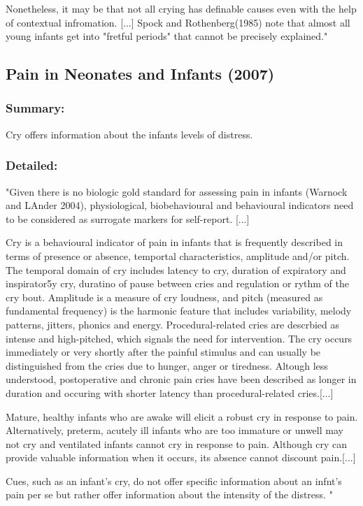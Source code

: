 \documentclass[11pt,twocolumn]{scrartcl}
\begin{document}
Nonetheless, it may be that not all crying has definable causes even with the help of contextual infromation. [...] Spock and Rothenberg(1985) note that almost all young infants get into "fretful periods" that cannot be precisely explained." \cite{Gustafson2000}

\subsection{Pain in Neonates and Infants (2007)}

\subsubsection*{Summary:} 
Cry offers information about the infants levels of distress.

\subsubsection*{Detailed:}

"Given there is no biologic gold standard for assessing pain in infants (Warnock and LAnder 2004), physiological, biobehavioural and behavioural indicators need to be considered as surrogate markers for self-report. [...]

Cry is a behavioural indicator of pain in infants that is frequently described in terms of presence or absence, temportal characteristics, amplitude and/or pitch. The temporal domain of cry includes latency to cry, duration of expiratory and inspirator5y cry, duratino of pause between cries and regulation or rythm of the cry bout. Amplitude is a measure of cry loudness, and pitch (measured as fundamental frequency) is the harmonic feature that includes variability, melody patterns, jitters, phonics and energy. Procedural-related cries are descrbied as intense and high-pitched, which signals the need for intervention. The cry occurs immediately or very shortly after the painful stimulus and can usually be distinguished from the cries due to hunger, anger or tiredness. Altough less understood, postoperative and chronic pain cries have been described as longer in duration and occuring with shorter latency than procedural-related cries.[...] 

Mature, healthy infants who are awake will elicit a robust cry in response to pain. Alternatively, preterm, acutely ill infants who are too immature or unwell may not cry and ventilated infants cannot cry in response to pain. Although cry can provide valuable information when it occurs, its absence cannot discount pain.[...]

Cues, such as an infant's cry, do not offer specific information about an infnt's pain per se but rather offer information about the intensity of the distress.
" 


\cite{Stevens2006}



\end{document}
